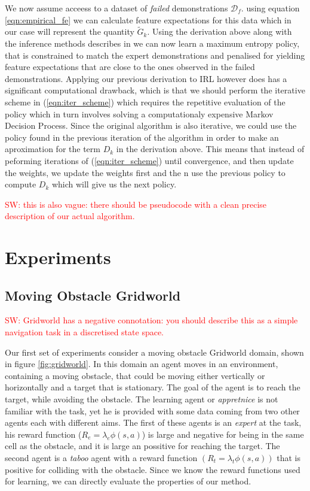 \documentclass[letterpaper]{article}
\newcommand{\sw}[1]{\textcolor{red}{SW: #1}}
\begin{document}
We now assume acceess to a dataset of \emph{failed} demonstrations $\mathcal{D}_f$.
using equation \ref{eqn:empirical_fe} we can calculate feature expectations for this data
which in our case will represent the quantity $\widetilde{G}_k$. Using the derivation above along with the
inference methods describes in \cite{ziebart2010modelingthesis} we can now learn a maximum entropy policy, that is 
constrained to match the expert demonstrations and penalised for yielding feature expectations that are close
to the ones observed in the failed demonstrations. Applying our previous derivation to IRL however does
has a significant computational drawback, which is that we should perform the iterative scheme in (\ref{eqn:iter_scheme})
which requires the repetitive evaluation of the policy which in turn involves solving a computationaly expensive Markov Decision Process. Since the original algorithm is also iterative, we could use the policy found in the
previous iteration of the algorithm in order to make an aproximation for the term $D_k$ in the derivation above. This means that
instead of peforming iterations of (\ref{eqn:iter_scheme}) until convergence, and then update the weights, we update the weights first
and the n use the previous policy to compute $D_k$ which will give us the next policy.

\sw{this is also vague: there should be pseudocode with a clean precise description of our actual algorithm.}

\section{Experiments}
\subsection{Moving Obstacle Gridworld}

\sw{Gridworld has a negative connotation: you should describe this as a simple navigation task in a discretised state space.}

Our first set of experiments consider a moving obstacle Gridworld domain, shown in figure \ref{fig:gridworld}.
In this domain an agent moves in an environment, containing a moving obstacle, that could be moving either vertically
or horizontally and a target that is stationary. The goal of the agent is to reach the target, while avoiding 
the obstacle. The learning agent or \emph{appretnice} is not familiar with the task, yet he is provided with some data coming from two other agents
each with different aims. The first of these agents is an \emph{expert} at the task, his reward function ($R_e = \lambda_e\phi(s,a)$) is large and negative
for being in the same cell as the obstacle, and it is large an possitive for reaching the target. The second agent is a
\emph{taboo} agent with a reward function $(R_t=\lambda_t\phi(s,a))$ that is positive for colliding with the obstacle. Since we know the reward functions used for learning, we can directly evaluate the properties of our method. 
\end{document}
